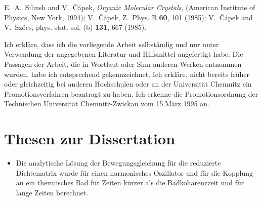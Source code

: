 \documentclass[12pt,twoside,a4paper]{report}
\begin{document}
{\begin{thebibliography}{999}
 
 







 E.~A.~Silinsh and  V.~\v{C}\'{a}pek, 
                 {\it Organic Molecular Crystals}, 
                 (American Institute of Physics, New York, 1994);
                  V.~\v{C}\'{a}pek, 
                  Z.~Phys. B {\bf 60}, 101 (1985);
                  V.~\v{C}\'{a}pek and V.~Sz\"ocs,
                 phys. stat. sol. (b) {\bf 131}, 667 (1985).



\end{thebibliography}
%
\newpage\pagestyle{empty}

\begin{center}
\parbox{14cm}{\large Ich erkl\"are, dass ich die vorliegende Arbeit
selbst\"andig und nur unter Verwendung der angegebenen Literatur und
Hilfsmittel angefertigt habe. Die Passagen der Arbeit, die in Wortlaut
oder Sinn anderen Werken entnommen wurden, habe ich entsprechend
gekennzeichnet. Ich erkl\"are, nicht bereits fr\"uher oder gleichzeitig
bei anderen Hochschulen oder an der Universit\"at Chemnitz ein
Promotionsverfahren beantragt zu haben. Ich erkenne die
Promotionsordnung der Technischen Universit\"at Chemnitz-Zwickau vom
15.M\"arz 1995 an.}
\vspace*{3cm}
\end{center}

\chapter*{Thesen zur Dissertation}
\begin{itemize}
\item
Die analytische L\"osung 
    der Bewegungsgleichung f\"ur die reduzierte Dichtematrix
wurde
    f\"ur einen harmonisches Oszillator
und
    f\"ur die Kopplung an ein thermisches Bad 
    f\"ur Zeiten k\"urzer als die Badkoh\"arenzzeit
    und 
    f\"ur lange Zeiten
berechnet.






\end{itemize}}
\end{document}
